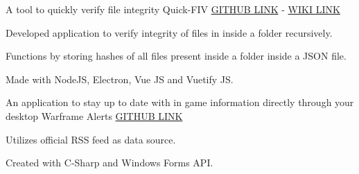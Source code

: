 \begin{cventries}

\cventry
{A tool to quickly verify file integrity} %
{Quick-FIV} %
{\href{https://github.com/Ali60351/Quick-FIV}{\color{awesome-skyblue}GITHUB LINK} - \href{https://github.com/Ali60351/Quick-FIV/wiki}{\color{awesome-skyblue}WIKI LINK}} %
{} %
{ %
\begin{cvitems}
\item {Developed application to verify integrity of files in inside a folder recursively.}
\item {Functions by storing hashes of all files present inside a folder inside a JSON file.}
\item {Made with NodeJS, Electron, Vue JS and Vuetify JS.}
\end{cvitems}
}


\cventry
{An application to stay up to date with in game information directly through your desktop} %
{Warframe Alerts} %
{\href{https://github.com/WFCD/warframe-alerts-win}{\color{awesome-skyblue}GITHUB LINK}} %
{} %
{ %
\begin{cvitems}
\item {Utilizes official RSS feed as data source.}
\item {Created with C-Sharp and Windows Forms API.}
\end{cvitems}
}


\end{cventries}